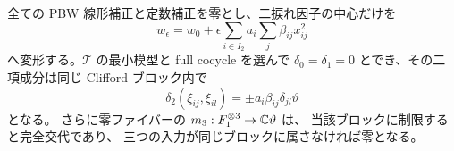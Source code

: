 \begin{lemma}
\label{ebc:lem:clifford-binary}
全ての PBW 線形補正と定数補正を零とし、二捩れ因子の中心だけを
\[
       w_\epsilon=w_0+
             \epsilon\sum_{i\in I_2}a_i\sum_j\beta_{ij}x_{ij}^2
\]
へ変形する。$\mathcal T$ の最小模型と full cocycle を選んで
$\delta_0=\delta_1=0$ とでき、その二項成分は同じ Clifford ブロック内で
\begin{equation}\label{ebc:eq:clifford-binary}
        \delta_2(\xi_{ij},\xi_{il})
                 =\pm a_i\beta_{ij}\delta_{jl}\vartheta
\end{equation}
となる。
さらに零ファイバーの $m_3:F_1^{\otimes3}\to\mathbb C\vartheta$ は、
当該ブロックに制限すると完全交代であり、
三つの入力が同じブロックに属さなければ零となる。
\end{lemma}

